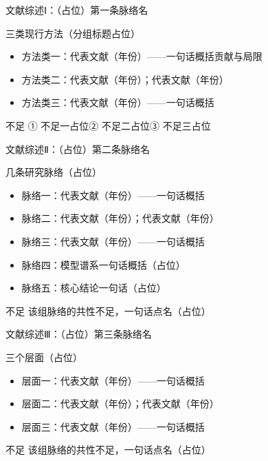 \documentclass[aspectratio=169,11pt]{beamer}
\begin{document}
\begin{frame}{文献综述Ⅰ：（占位）第一条脉络名}
  \footnotesize
  \begin{dmupoint}{三类现行方法（分组标题占位）}
    \begin{itemize}
      \item \textcolor{dmuhead}{方法类一}：代表文献（年份）——一句话概括贡献与局限
      \item \textcolor{dmuhead}{方法类二}：代表文献（年份）；代表文献（年份）
      \item \textcolor{dmuhead}{方法类三}：代表文献（年份）——一句话概括
    \end{itemize}
  \end{dmupoint}
  \begin{dmualert}{不足}
    ① 不足一占位\quad ② 不足二占位\quad ③ 不足三占位
  \end{dmualert}
\end{frame}

\begin{frame}{文献综述Ⅱ：（占位）第二条脉络名}
  \footnotesize
  \begin{dmupoint}{几条研究脉络（占位）}
    \begin{itemize}
      \item \textcolor{dmuhead}{脉络一}：代表文献（年份）——一句话概括
      \item \textcolor{dmuhead}{脉络二}：代表文献（年份）；代表文献（年份）
      \item \textcolor{dmuhead}{脉络三}：代表文献（年份）——一句话概括
      \item \textcolor{dmuhead}{脉络四}：模型谱系一句话概括（占位）
      \item \textcolor{dmuhead}{脉络五}：核心结论一句话（占位）
    \end{itemize}
  \end{dmupoint}
  \begin{dmualert}{不足}
    该组脉络的共性不足，一句话点名（占位）
  \end{dmualert}
\end{frame}

\begin{frame}{文献综述Ⅲ：（占位）第三条脉络名}
  \footnotesize
  \begin{dmupoint}{三个层面（占位）}
    \begin{itemize}
      \item \textcolor{dmuhead}{层面一}：代表文献（年份）——一句话概括
      \item \textcolor{dmuhead}{层面二}：代表文献（年份）；代表文献（年份）
      \item \textcolor{dmuhead}{层面三}：代表文献（年份）——一句话概括
    \end{itemize}
  \end{dmupoint}
  \begin{dmualert}{不足}
    该组脉络的共性不足，一句话点名（占位）
  \end{dmualert}
\end{frame}
\end{document}
